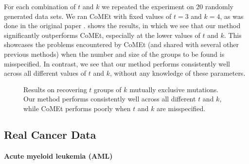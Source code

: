For each combination of $t$ and $k$ we repeated the experiment on $20$ randomly generated data sets.
We ran CoMEt with fixed values of $t = 3$ and $k = 4$, as was done in the original paper \citep{comet}.
 shows the results, in which we see that our method significantly outperforms CoMEt, especially at the lower values of $t$ and $k$.
This showcases the problems encountered by CoMEt (and shared with several other previous methods) when the number and size of the groups to be found is misspecified.
In contrast, we see that our method performs consistently well across all different values of $t$ and $k$, without any knowledge of these parameters.


\setlength{}
\setlength{}
\begin{figure}[htb]
  \centering
  
  \caption{Results on recovering $t$ groups of $k$ mutually exclusive mutations.
Our method performs consistently well across all different $t$ and $k$, while CoMEt performs poorly when $t$ and $k$ are misspecified.
  }
  \label{fig:syn_multi}
\end{figure}

\subsection{Real Cancer Data}

\paragraph{Acute myeloid leukemia (AML)}

